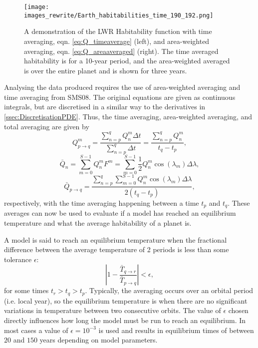 \documentclass[12pt, onecolumn]{revtex4-2}    %
\begin{document}
\begin{figure}
  \texttt{[image: images\_rewrite/Earth\_habitabilities\_time\_190\_192.png]}
  \caption{
    A demonstration of the LWR Habitability function with time averaging, eqn. \eqref{eq:Q_timeaverage} (left), and area-weighted averaging, eqn. \eqref{eq:Q_areaaveraged} (right).
    The time averaged habitability is for a 10-year period, and the area-weighted averaged is over the entire planet and is shown for three years.
  }
  \label{fig:time_area_habitability_demonstration}
\end{figure}

Analysing the data produced requires the use of area-weighted averaging and time averaging from SMS08.
The original equations are given as continuous integrals, but are discretised in a similar way to the derivatives in \ref{ssec:DiscretisationPDE}.
Thus, the time averaging, area-weighted averaging, and total averaging are given by
\begin{equation}
    Q^m_{p \to q}  = \frac{\sum_{n=p}^{q} Q^m_n \Delta t} {\sum_{n=p}^{q} \Delta t} 
                   = \frac{\sum_{n=p}^{q} Q^m_n}{t_q-t_p},
  \label{eq:Q_timeaverage}
\end{equation}
\begin{equation}
  \bar{Q}_n = \sum_{m=0}^{S-1} Q^m_n F^m = \sum_{m = 0}^{S-1} \frac{1}{2}Q^m_n \cos(\lambda_m) \Delta\lambda,
  \label{eq:Q_areaaveraged}
\end{equation}
\begin{equation}
  \bar{Q}_{p \to q} = \frac{\sum_{n=p}^{q} \sum_{m = 0}^{S-1} Q^m_n \cos(\lambda_m) \Delta\lambda}{2(t_q-t_p)},
  \label{eq:Q_totalaverage}
\end{equation}
respectively, with the time averaging happening between a time $t_p$ and $t_q$.
These averages can now be used to evaluate if a model has reached an equilibrium temperature and what the average habitability of a planet is.

A model is said to reach an equilibrium temperature when the fractional difference between the average temperature of 2 periods is less than some tolerance $\epsilon$:
\begin{equation}
  \left|1 - \frac{\bar{T}_{q \to r}}{\bar{T}_{p \to q}}\right| < \epsilon,
  \label{eq:T_equilb}
\end{equation}
for some times $t_r > t_q > t_p$.
Typically, the averaging occurs over an orbital period (i.e. local year), so the equilibrium temperature is when there are no significant variations in temperature between two consecutive orbits.
The value of $\epsilon$ chosen directly influences how long the model must be run to reach an equilibrium.
In most cases a value of $\epsilon = 10^{-3}$ is used and results in equilibrium times of between $20$ and $150$ years depending on model parameters.
\end{document}
